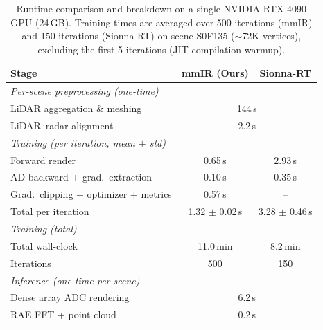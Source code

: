 \begin{table}[ht!]
\centering
\caption{Runtime comparison and breakdown on a single NVIDIA RTX 4090 GPU (24\,GB). Training times are averaged over 500 iterations (mmIR) and 150 iterations (Sionna-RT) on scene S0F135 ($\sim$72K vertices), excluding the first 5 iterations (JIT compilation warmup).}
\label{tab:runtime}
\begin{tabular}{lcc}
\toprule
\textbf{Stage} & \textbf{mmIR (Ours)} & \textbf{Sionna-RT} \\
\midrule
\multicolumn{3}{l}{\emph{Per-scene preprocessing (one-time)}} \\
\quad LiDAR aggregation \& meshing & \multicolumn{2}{c}{144\,s} \\
\quad LiDAR--radar alignment & \multicolumn{2}{c}{2.2\,s} \\
\midrule
\multicolumn{3}{l}{\emph{Training (per iteration, mean $\pm$ std)}} \\
\quad Forward render & 0.65\,s & 2.93\,s \\
\quad AD backward + grad.\ extraction & 0.10\,s & 0.35\,s \\
\quad Grad.\ clipping + optimizer + metrics & 0.57\,s & -- \\
\quad Total per iteration & 1.32 $\pm$ 0.02\,s & 3.28 $\pm$ 0.46\,s \\
\midrule
\multicolumn{3}{l}{\emph{Training (total)}} \\
\quad Total wall-clock & 11.0\,min & 8.2\,min \\
\quad Iterations & 500 & 150 \\
\midrule
\multicolumn{3}{l}{\emph{Inference (one-time per scene)}} \\
\quad Dense array ADC rendering & \multicolumn{2}{c}{6.2\,s} \\
\quad RAE FFT + point cloud & \multicolumn{2}{c}{0.2\,s} \\
\bottomrule
\end{tabular}
\end{table}
